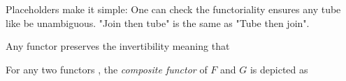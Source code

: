 Placeholders make it simple:
One can check the functoriality ensures any tube like
be unambiguous. "Join then tube" is the same as "Tube then join".

\begin{proposition}\label{f.p.inv}
Any functor preserves the invertibility meaning that
\end{proposition}

\begin{definition}
For any two functors 
, the \emph{composite functor} of $F$ and $G$
is depicted as 
\end{definition}


